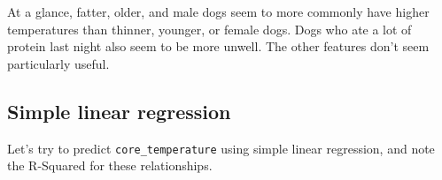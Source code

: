 \documentclass[11pt]{article}
\begin{document}
    
    
    
    
    
    
    
    
    
    
    
    
    
    
    At a glance, fatter, older, and male dogs seem to more commonly have
higher temperatures than thinner, younger, or female dogs. Dogs who ate
a lot of protein last night also seem to be more unwell. The other
features don't seem particularly useful.

\hypertarget{simple-linear-regression}{%
\subsection{Simple linear regression}\label{simple-linear-regression}}

Let's try to predict \texttt{core\_temperature} using simple linear
regression, and note the R-Squared for these relationships.
\end{document}
